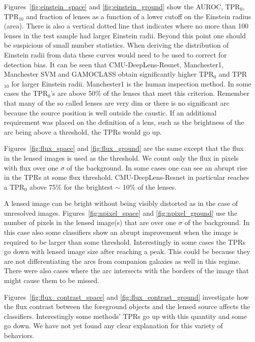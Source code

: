 \documentclass{aa}
\newcommand{\red}[1]{{\color{red} #1}}
\begin{document}
Figures~\ref{fig:einstein_space} and \ref{fig:einstein_ground} show the AUROC, TPR$_0$, TPR$_{10}$ and fraction of lenses as a function of a lower cutoff on the Einstein radius (area).  There is also a vertical dotted line that indicates 
where no more than 100 lenses in the test sample had larger Einstein radii.  Beyond this point one should be suspicious of small number statistics.  When deriving the distribution of Einstein radii from data these curves would need to be used to correct for detection bias.  It can be seen that CMU-DeepLens-Resnet, Manchester1, Manchester SVM and GAMOCLASS obtain significantly higher TPR$_0$ and  TPR$_{10}$ for larger Einstein radii.  Manchester1 is the human inspection method.  In some cases the TPR$_0$'s are above 50\% of the lenses that meet this criterion.  Remember that many of the so called lenses are very dim or there is no significant arc because the source position is well outside the caustic.  If an additional requirement was placed on the definition of a lens, such as the brightness of the arc being above a threshold, the TPRs would go up.

Figures~\ref{fig:flux_space} and \ref{fig:flux_ground} are the same except that the flux in the lensed images is used as the threshold.  We count only the flux in pixels with flux over one $\sigma$ of the background.  In some cases one can see an abrupt rise in the TPRs at some flux threshold.  CMU-DeepLens-Resnet in particular reaches a TPR$_0$ above 75\% for the brightest $\sim$ 10\% of the lenses. %

A lensed image can be bright without being visibly distorted as in the case of unresolved images.  Figures~\ref{fig:npixel_space} and \ref{fig:npixel_ground} use the number of pixels in the lensed image(s) that are over  one $\sigma$ of the background.  In this case also some classifiers show an abrupt improvement when the image is required to be larger than some threshold.  Interestingly in some cases the TPRs go down with lensed image size after reaching a peak.  This could be because they are not differentiating the arcs from companion galaxies as well in this regime.  There were also cases where the arc intersects with the borders of the image that might cause them to be missed.

Figures~\ref{fig:flux_contrast_space} and \ref{fig:flux_contrast_ground} investigate how the flux contrast between the foreground objects and the lensed source affects the classifiers.  Interestingly some methods' TPRs go up with this quantity and some go down.  We have not yet found any clear explanation for this variety of behaviors.  
\end{document}
